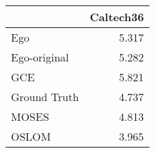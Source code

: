 \begin{tabular}{lr}
\toprule
{} & Caltech36 \\
\midrule
Ego          &     5.317 \\
Ego-original &     5.282 \\
GCE          &     5.821 \\
Ground Truth &     4.737 \\
MOSES        &     4.813 \\
OSLOM        &     3.965 \\
\bottomrule
\end{tabular}
